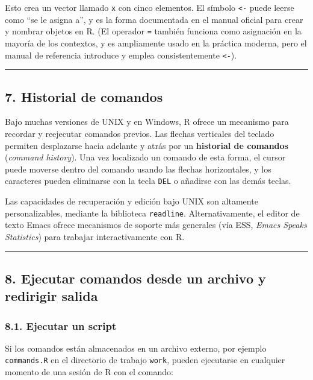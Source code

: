 \documentclass[
  jou,
  floatsintext,
  longtable,
  a4paper,
  nolmodern,
  notxfonts,
  notimes,
  12pt,
  colorlinks=true,linkcolor=blue,citecolor=blue,urlcolor=blue]{apa7}
\begin{document}
Esto crea un vector llamado \texttt{x} con cinco elementos. El símbolo
\texttt{\textless{}-} puede leerse como ``se le asigna a'', y es la
forma documentada en el manual oficial para crear y nombrar objetos en
R. (El operador \texttt{=} también funciona como asignación en la
mayoría de los contextos, y es ampliamente usado en la práctica moderna,
pero el manual de referencia introduce y emplea consistentemente
\texttt{\textless{}-}).

\begin{center}\rule{0.5\linewidth}{0.5pt}\end{center}

\subsection{7. Historial de comandos}\label{historial-de-comandos}

Bajo muchas versiones de UNIX y en Windows, R ofrece un mecanismo para
recordar y reejecutar comandos previos. Las flechas verticales del
teclado permiten desplazarse hacia adelante y atrás por un
\textbf{historial de comandos} (\emph{command history}). Una vez
localizado un comando de esta forma, el cursor puede moverse dentro del
comando usando las flechas horizontales, y los caracteres pueden
eliminarse con la tecla \texttt{DEL} o añadirse con las demás teclas.

Las capacidades de recuperación y edición bajo UNIX son altamente
personalizables, mediante la biblioteca \texttt{readline}.
Alternativamente, el editor de texto Emacs ofrece mecanismos de soporte
más generales (vía ESS, \emph{Emacs Speaks Statistics}) para trabajar
interactivamente con R.

\begin{center}\rule{0.5\linewidth}{0.5pt}\end{center}

\subsection{8. Ejecutar comandos desde un archivo y redirigir
salida}\label{ejecutar-comandos-desde-un-archivo-y-redirigir-salida}

\subsubsection{8.1. Ejecutar un script}\label{ejecutar-un-script}

Si los comandos están almacenados en un archivo externo, por ejemplo
\texttt{commands.R} en el directorio de trabajo \texttt{work}, pueden
ejecutarse en cualquier momento de una sesión de R con el comando:
\end{document}
